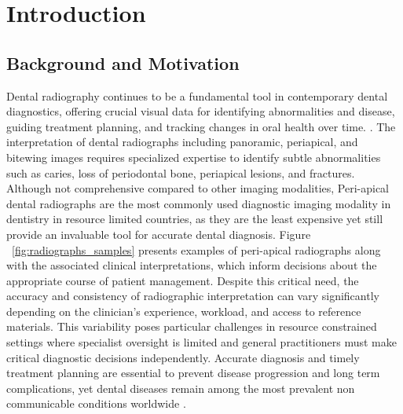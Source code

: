 \documentclass[12pt,a4paper]{report}
\begin{document}


    
	
	\clearpage
	
	\setcounter{page}{1}   %
	
	
	
	
	
	\chapter{Introduction}
	\label{chap:introduction}
	
	\section{Background and Motivation}
	
	Dental radiography continues to be a fundamental tool in contemporary dental diagnostics, offering crucial visual data for identifying abnormalities and disease, guiding treatment planning, and tracking changes in oral health over time. \cite{white_pharoah_radiology}. The interpretation of dental radiographs including panoramic, periapical, and bitewing images requires specialized expertise to identify subtle abnormalities such as caries, loss of periodontal bone, periapical lesions, and fractures. Although not comprehensive compared to other imaging modalities, Peri-apical dental radiographs are the most commonly used diagnostic imaging modality in dentistry in resource limited countries, as they are the least expensive yet still provide an invaluable tool for accurate dental diagnosis. Figure ~\ref{fig:radiographs_samples} presents examples of peri-apical radiographs along with the associated clinical interpretations, which inform decisions about the appropriate course of patient management.  Despite this critical need, the accuracy and consistency of radiographic interpretation can vary significantly depending on the clinician's experience, workload, and access to reference materials. This variability poses particular challenges in resource constrained settings where specialist oversight is limited and general practitioners must make critical diagnostic decisions independently. Accurate diagnosis and timely treatment planning are essential to prevent disease progression and long term complications, yet dental diseases remain among the most prevalent non communicable conditions worldwide \cite{who_oral_health, world2024global}.
	
\end{document}
